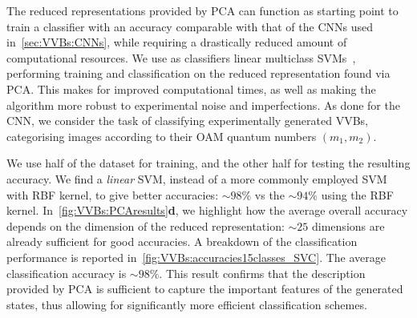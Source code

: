 The reduced representations provided by \ac{PCA} can function as starting point to train a classifier with an accuracy comparable with that of the \acp{CNN} used in~\cref{sec:VVBs:CNNs}, while requiring a drastically reduced amount of computational resources.
We use as classifiers linear multiclass \acp{SVM}~\cite{hearst1998support,shawe2000support}, performing training and classification on the reduced representation found via \ac{PCA}. This makes for improved computational times, as well as making the algorithm more robust to experimental noise and imperfections.
As done for the \ac{CNN}, we consider the task of classifying experimentally generated VVBs, categorising images according to their OAM quantum numbers $(m_1,m_2)$.

We use half of the dataset for training, and the other half for testing the resulting accuracy.
We find a \emph{linear} SVM, instead of a more commonly employed SVM with RBF kernel, to give better accuracies: $\sim98\%$ vs the $\sim94\%$ using the RBF kernel.
In~\cref{fig:VVBs:PCAresults}\textbf{d}, we highlight how the average overall accuracy depends on the dimension of the reduced representation: $\sim 25$ dimensions are already sufficient for good accuracies.
A breakdown of the classification performance is reported in~\cref{fig:VVBs:accuracies15classes_SVC}.
The average classification accuracy is $\sim 98 \%$. This result confirms that the description provided by \ac{PCA} is sufficient to capture the important features of the generated states, thus allowing for significantly more efficient classification schemes.

